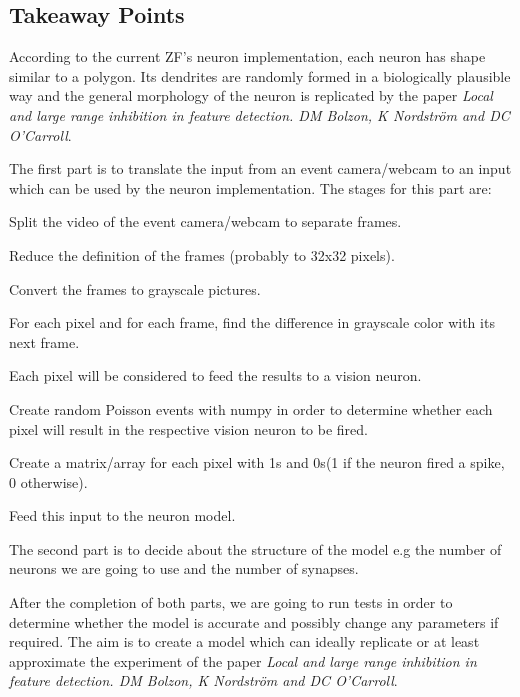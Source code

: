 \documentclass{article}
\begin{document}
{\addtolength{\leftskip}{3mm}
\subsection*{Takeaway Points}
}
\begin{compactenum}
\item According to the current ZF's neuron implementation, each neuron has shape similar to a polygon. Its dendrites are randomly formed in a biologically plausible way and the general morphology of the neuron is replicated by the paper \textit{Local and large ­range inhibition in feature detection. DM Bolzon, K Nordström and DC O'Carroll}.
\item The first part is to translate the input from an event camera/webcam to an input which can be used by the neuron implementation. The stages for this part are:
	\begin{compactenum}
	\item Split the video of the event camera/webcam to separate frames.
	\item Reduce the definition of the frames (probably to 32x32 pixels).
	\item Convert the frames to grayscale pictures.
	\item For each pixel and for each frame, find the difference in grayscale color with its next frame.
	\item Each pixel will be considered to feed the results to a vision neuron.
	\item Create random Poisson events with numpy in order to determine whether each pixel will result in the respective vision neuron to be fired.
	\item Create a matrix/array for each pixel with 1s and 0s(1 if the neuron fired a spike, 0 otherwise).
	\item Feed this input to the neuron model.
	\end{compactenum}
\item The second part is to decide about the structure of the model e.g the number of neurons we are going to use and  the number of synapses.

\item After the completion of both parts, we are going to run tests in order to determine whether the model is accurate and possibly change any parameters if required. The aim is to create a model which can ideally replicate or at least approximate the experiment of the paper \textit{Local and large ­range inhibition in feature detection. DM Bolzon, K Nordström and DC O'Carroll}.
\end{compactenum}
\end{document}
